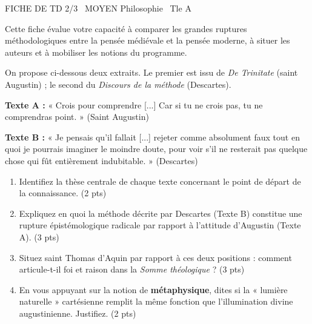 \documentclass[11pt]{article}
\begin{document}
\begin{tcolorbox}[enhanced,colback=popink,colframe=popink,arc=10pt,boxrule=0pt,left=12pt,right=12pt,top=9pt,bottom=9pt]
{\color{white}\popxbold\small FICHE DE TD 2/3 \textbullet\ MOYEN \hfill Philosophie \textbullet\ Tle A\par}
\end{tcolorbox}
\vspace{4pt}
Cette fiche évalue votre capacité à comparer les grandes ruptures méthodologiques entre la pensée médiévale et la pensée moderne, à situer les auteurs et à mobiliser les notions du programme.

\begin{exercice}
On propose ci-dessous deux extraits. Le premier est issu de \textit{De Trinitate} (saint Augustin) ; le second du \textit{Discours de la méthode} (Descartes).

\textbf{Texte A :} « Crois pour comprendre [...] Car si tu ne crois pas, tu ne comprendras point. » (Saint Augustin)

\textbf{Texte B :} « Je pensais qu'il fallait [...] rejeter comme absolument faux tout en quoi je pourrais imaginer le moindre doute, pour voir s'il ne resterait pas quelque chose qui fût entièrement indubitable. » (Descartes)

\begin{enumerate}
    \item Identifiez la thèse centrale de chaque texte concernant le point de départ de la connaissance. (2 pts)
    \item Expliquez en quoi la méthode décrite par Descartes (Texte B) constitue une rupture épistémologique radicale par rapport à l'attitude d'Augustin (Texte A). (3 pts)
    \item Situez saint Thomas d'Aquin par rapport à ces deux positions : comment articule-t-il foi et raison dans la \textit{Somme théologique} ? (3 pts)
    \item En vous appuyant sur la notion de \textbf{métaphysique}, dites si la « lumière naturelle » cartésienne remplit la même fonction que l'illumination divine augustinienne. Justifiez. (2 pts)
\end{enumerate}
\end{exercice}
\end{document}
